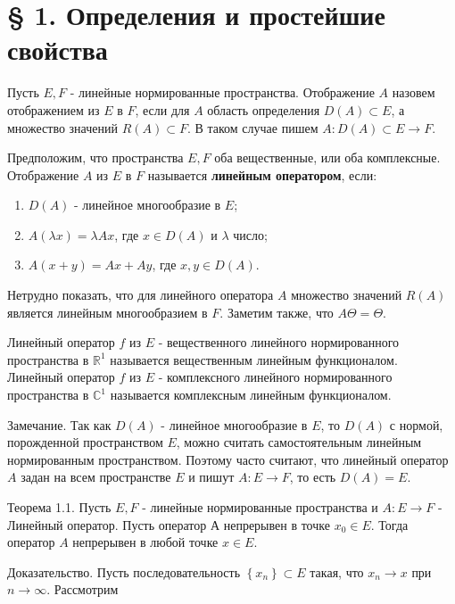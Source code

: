 


\section*{§ 1. Определения и простейшие свойства}
Пусть $E, F$ - линейные нормированные пространства. Отображение $A$ назовем отображением из $E$ в $F$, если для $A$ область определения $D(A) \subset E$, а множество значений $R(A) \subset F$. В таком случае пишем $A: D(A) \subset E \rightarrow F$.

Предположим, что пространства $E, F$ оба вещественные, или оба комплексные. Отображение $A$ из $E$ в $F$ называется \textbf{линейным оператором}, если:

\begin{enumerate}
	\item $D(A)$ - линейное многообразие в $E$;

	\item $A(\lambda x)=\lambda A x$, где $x \in D(A)$ и $\lambda$ число;

	\item $A(x+y)=A x+A y$, где $x, y \in D(A)$.

\end{enumerate}

Нетрудно показать, что для линейного оператора $A$ множество значений $R(A)$ является линейным многообразием в $F$. Заметим также, что $A \Theta=\Theta$.

Линейный оператор $f$ из $E$ - вещественного линейного нормированного пространства в $\mathbb{R}^{1}$ называется вещественным линейным функционалом. Линейный оператор $f$ из $E$ - комплексного линейного нормированного пространства в $\mathbb{C}^{1}$ называется комплексным линейным функционалом.

Замечание. Так как $D(A)$ - линейное многообразие в $E$, то $D(A)$ с нормой, порожденной пространством $E$, можно считать самостоятельным линейным нормированным пространством. Поэтому часто считают, что линейный оператор $A$ задан на всем пространстве $E$ и пишут $A: E \rightarrow F$, то есть $D(A)=E$.

Теорема 1.1. Пусть $E, F$ - линейные нормированные пространства и $A: E \rightarrow F$ - Линейный оператор. Пусть оператор А непрерывен в точке $x_{0} \in E$. Тогда оператор $A$ непрерывен в любой точке $x \in E$.

Доказательство. Пусть последовательность $\left\{x_{n}\right\} \subset E$ такая, что $x_{n} \rightarrow x$ при $n \rightarrow \infty$. Рассмотрим


